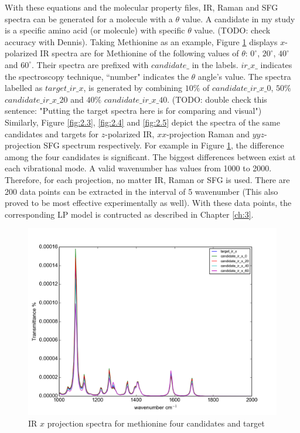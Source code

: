 With these equations and the molecular property files, IR, Raman and SFG spectra can be generated for a molecule with a $\theta$ value. A candidate in my study is a specific amino acid (or molecule) with specific $\theta$ value. (TODO: check accuracy with Dennis). Taking Methionine as an example, Figure \ref{fig:2.2} displays  
 $x$-polarized IR spectra are for Methionine of the following values of $\theta$: $0^{\circ}$, $20^{\circ}$, $40^{\circ}$ and $60^{\circ}$. Their spectra are prefixed with $candidate\_$ in the labels. $ir\_x\_$ indicates the spectroscopy technique, ``number" indicates the $\theta$ angle's value. The spectra labelled as $target\_ir\_x$, is generated by combining $10\%$ of $candidate\_ir\_x\_0$, $50\%$ $candidate\_ir\_x\_20$ and $40\%$ $candidate\_ir\_x\_40$. (TODO: double check this sentence: "Putting the target spectra here is for comparing and visual")  \\

Similarly, Figure \ref{fig:2.3}, \ref{fig:2.4} and \ref{fig:2.5} depict the spectra of the same candidates and targets for $z$-polarized IR, $xx$-projection Raman and $yyz$-projection SFG spectrum respectively. For example in Figure \ref{fig:2.2}, the difference among the four candidates is significant. The biggest differences between exist at each vibrational mode. A valid wavenumber has values from 1000 to 2000. Therefore, for each projection, no matter IR, Raman or SFG is used. There are 200 data points can be extracted in the interval of 5 wavenumber (This also proved to be most effective experimentally as well).  With these data points, the corresponding LP model is contructed as described in Chapter \ref{ch:3}.\\

\begin{figure}[!ht]
\centering
\includegraphics[scale=0.5]{Figures/Met_candidates_plotting_ir_x.png}
\caption{IR $x$ projection spectra for methionine four candidates and target} \label{fig:2.2}
\end{figure}

